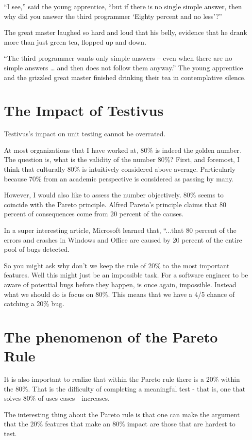 {“I see,” said the young apprentice, “but if there is no single simple answer, then why did you answer the third programmer ‘Eighty percent and no less’?”

The great master laughed so hard and loud that his belly, evidence that he drank more than just green tea, flopped up and down.

“The third programmer wants only simple answers – even when there are no simple answers … and then does not follow them anyway.” The young apprentice and the grizzled great master finished drinking their tea in contemplative silence.}

\section{The Impact of Testivus}
Testivus's impact on unit testing cannot be overrated. 

At most organizations that I have worked at, 80\% is indeed the golden number. The question is, what is the validity of the number 80\%? First, and foremost, I think that culturally 80\% is intuitively considered above average. Particularly because 70\% from an academic perspective is considered as passing by many.

However, I would also like to assess the number objectively. 80\% seems to coincide with the Pareto principle. Alfred Pareto's principle claims that 80 percent of consequences come from 20 percent of the causes. 

In a super interesting article, Microsoft learned that, “...that 80 percent of the errors and crashes in Windows and Office are caused by 20 percent of the entire pool of bugs detected.

So you might ask why don't we keep the rule of 20\% to the most important features. Well this might just be an impossible task. For a software engineer to be aware of potential bugs before they happen, is once again, impossible. Instead what we should do is focus on 80\%. This means that we have a 4/5 chance of catching a 20\% bug.

\section{The phenomenon of the Pareto Rule}
It is also important to realize that within the  Pareto rule there is a 20\% within the 80\%. That is the difficulty of  completing a meaningful test - that is, one that solves 80\% of uses cases - increases.

The interesting thing about the Pareto rule is that one can make the argument that the 20\% features that make an 80\% impact are those that are hardest to test. 

